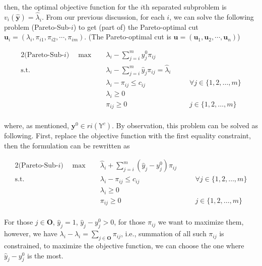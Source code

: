             then, the optimal objective function for the $i$th separated subproblem is $v_i(\mathbf{\hat{y}}) = \hat{\lambda}_i$. From our previous discussion, for each $i$, we can solve the following problem (Pareto-Sub-$i$) to get (part of) the Pareto-optimal cut $\mathbf{u}_{i} = (\lambda_i, \pi_{i1}, \pi_{i2}, \cdots, \pi_{im})$. (The Pareto-optimal cut is $\mathbf{u} = (\mathbf{u}_1, \mathbf{u}_2, \cdots, \mathbf{u}_n)$)

            \begin{alignat*}{2}
                \text{(Pareto-Sub-$i$)} \quad \max \quad & \lambda_i - \sum_{j = i}^m y^0_j \pi_{ij}\\
                \text{s.t.} \quad & \lambda_i - \sum_{j = i}^m \hat{y}_j \pi_{ij} = \hat{\lambda}_i\\
                                  & \lambda_i - \pi_{ij} \le c_{ij}                  && \quad \forall j \in \{1, 2, \ldots, m\}\\
                                  & \lambda_i \ge 0                                  && \\
                                  & \pi_{ij} \ge 0                                   && \quad j \in \{1, 2, \ldots, m\}\\
            \end{alignat*}

            where, as mentioned, $\mathbf{y}^0 \in ri(\mathbb{Y}^c)$. By observation, this problem can be solved as following. First, replace the objective function with the first equality constraint, then the formulation can be rewritten as

            \begin{alignat*}{2}
                \text{(Pareto-Sub-$i$)} \quad \max \quad & \hat{\lambda}_i + \sum_{j = i}^m (\hat{y}_j - y_j^0) \pi_{ij}\\
                \text{s.t.} \quad & \lambda_i - \pi_{ij} \le c_{ij}                  && \quad \forall j \in \{1, 2, \ldots, m\}\\
                                  & \lambda_i \ge 0                                  && \\
                                  & \pi_{ij} \ge 0                                   && \quad j \in \{1, 2, \ldots, m\}\\
            \end{alignat*}

            For those $j \in \mathbf{O}$, $\hat{y}_j = 1$, $\hat{y}_j - y_j^0 > 0$, for those $\pi_{ij}$ we want to maximize them, however, we have $\lambda_i - \hat{\lambda}_i = \sum_{j \in \mathbf{O}} \pi_{ij}$, i.e., summation of all such $\pi_{ij}$ is constrained, to maximize the objective function, we can choose the one where $\hat{y}_j - y_j^0$ is the most.

